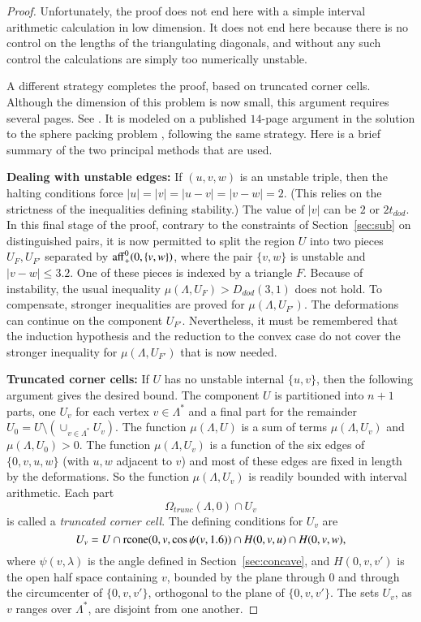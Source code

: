\begin{proof}
Unfortunately, the proof does not end here with a simple interval
arithmetic calculation in low dimension.  It does not end
here because there is no control on the
lengths of the triangulating diagonals, and without any such
control the calculations are simply too numerically unstable.


A different strategy completes the proof, based on truncated
corner cells.  Although the dimension of this problem is now small,
this argument requires several pages.
See \cite[pp.30-38]{arx}.  It is modeled on a published
$14$-page argument in the solution to the sphere packing problem
\cite[\S\S13.2-13.11]{DCG}, following the same strategy.
Here is a brief summary of the two principal  methods that are used.

\textbf {Dealing with unstable edges:}  
If $(u,v,w)$ is an unstable triple, then the
halting conditions force $|u|=|v|=|u-v|=|v-w|=2$.  (This
relies on the strictness of the inequalities defining stability.)
The value of $|v|$ can be $2$ or $2t_{dod}$. In this final
stage of the proof, contrary to the constraints of Section~\ref{sec:sub}
on distinguished pairs,
it is now permitted to split the region $U$ into two pieces
$U_F,U_{F'}$ separated by ${\operatorname{aff}}_+^0(0,\{v,w\})$, where
the pair $\{v,w\}$ is unstable and $|v-w|\le 3.2$.  
One of these pieces is indexed
by a triangle $F$.  Because of instability, the usual inequality
$\mu(\Lambda,U_F)> D_{dod}(3,1)$ does not hold.  To compensate,
stronger inequalities are proved for $\mu(\Lambda,U_{F'})$.
The deformations can continue on the component $U_{F'}$. Nevertheless,
it must be remembered that the induction hypothesis and the 
reduction to the convex case do not cover the stronger 
inequality for $\mu(\Lambda,U_{F'})$ that is now needed.

\textbf {Truncated corner cells:}  If $U$ has no unstable
internal $\{u,v\}$, then the following argument gives the
desired bound.  The component $U$ is partitioned into $n+1$
parts, one $U_v$ for each vertex $v\in\Lambda^*$ and a final part
for the remainder $U_0 = U\setminus(\cup_{v\in\Lambda^*} U_v)$.
The function $\mu(\Lambda,U)$ is a sum of terms $\mu(\Lambda,U_v)$
and $\mu(\Lambda,U_0) >0$.  The function $\mu(\Lambda,U_v)$
is a function of the six edges of $\{0,v,u,w\}$ (with $u,w$
adjacent to $v$) and most of these edges are fixed in length
by the deformations.  So the function $\mu(\Lambda,U_v)$
is readily bounded with interval arithmetic.  Each part
$$\Omega_{trunc}(\Lambda,0)\cap U_v$$
is called a {\it truncated corner cell}.  The defining conditions
for $U_v$ are
  $$
  U_v = U \cap {\operatorname{rcone}}(0,v,\cos\psi(v,1.6)) \cap H(0,v,u) \cap H(0,v,w),
  $$
where $\psi(v,\lambda)$ is the angle defined in Section~\ref{sec:concave},
and $H(0,v,v')$ is the open half space containing $v$, bounded by
the plane through $0$ and through the circumcenter
of $\{0,v,v'\}$, orthogonal to the plane of $\{0,v,v'\}$.  The
sets $U_v$, as $v$ ranges over $\Lambda^*$, are disjoint from one
another.



\end{proof}
